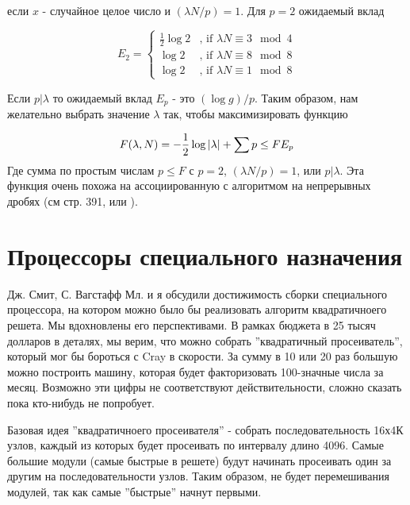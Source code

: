 \documentclass[russian, utf8, a4paper,12pt]{report}
\DeclarePairedDelimiter\abs{\lvert}{\rvert}%
\begin{document}
если $x$ - случайное целое число и $(\lambda N/p) = 1$. Для $p = 2$ ожидаемый вклад 

\begin{equation*}
E_2 = \begin{cases}
\frac{1}{2}\log{2} &\text{, if $\lambda N \equiv 3 \mod 4$}\\
\log{2}            &\text{, if $\lambda N \equiv 8 \mod 8$}\\
\log{2}          &\text{, if $\lambda N \equiv 1 \mod 8$}
\end{cases}
\end{equation*} 

Если $p|\lambda$ то ожидаемый вклад $E_p$ - это $(\log{g})/p$. Таким образом, нам желательно выбрать значение $\lambda$ так, чтобы максимизировать функцию

\begin{equation*}
F(\lambda, N) = -\frac{1}{2} \log{\abs{\lambda}} + \sum{p \leq F} E_p
\end{equation*}
Где  сумма по простым числам $p \leq F$ с $p = 2$, $(\lambda N /p) = 1$, или $p|\lambda$. Эта функция очень похожа на ассоциированную с алгоритмом на непрерывных дробях (см \cite{knuth} стр. 391, или \cite{wags}).

\section{Процессоры специального назначения}
Дж. Смит, С. Вагстафф Мл. и я обсудили достижимость сборки специального процессора, на котором можно было бы реализовать алгоритм квадратичноего решета. Мы вдохновлены его перспективами. В рамках бюджета в 25 тысяч долларов в деталях, мы верим, что можно собрать ''квадратичный просеиватель'', который мог бы бороться с Cray в скорости. За сумму в 10 или 20 раз большую можно построить машину, которая будет факторизовать 100-значные числа за месяц. Возможно эти цифры не соответствуют действительности, сложно сказать пока кто-нибудь не попробует.

Базовая идея ''квадратичноего просеивателя'' - собрать последовательность 16х4К узлов, каждый из которых будет просеивать по интервалу длино 4096. Самые большие модули (самые быстрые в решете) будут начинать просеивать один за другим на последовательности узлов. Таким образом, не будет перемешивания модулей, так как самые ''быстрые'' начнут первыми.

\nocite{*}





 
\end{document}
